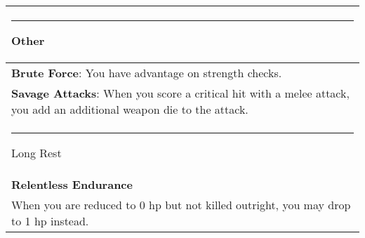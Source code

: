 \documentclass[twocolumn]{article}
\begin{document}
\\
\noindent\begin{tabular}{|m{3.1in}|}
\hline
\rule{.75in}{0pt}Other\\
\hline
\textbf{Brute Force}: You have advantage on strength checks. \\
\hline
\textbf{Savage Attacks}: When you score a critical hit with a melee attack, you add an additional weapon die to the attack. \\
\hline
\rule{1.22in}{0pt}Long Rest\\
\hline
\textbf{Relentless Endurance}\\
When you are reduced to 0 hp but not killed outright, you may drop to 1 hp instead. \\
\hline
\end{tabular}
\end{document}
